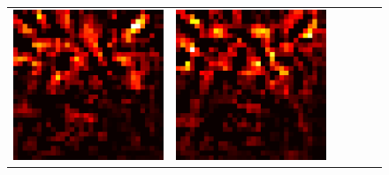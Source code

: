 \documentclass[preprint,12pt]{elsarticle}
\begin{document}
\begin{figure}[p]
\begin{tabular}{cccccc}
  \includegraphics[scale=\scale]{../visualizations/examples/cifar10/cnn/active_saliency_map/5.png} & 
  \includegraphics[scale=\scale]{../visualizations/examples/cifar10/cnn/inactive_saliency_map/5.png} \\
  

\end{tabular}
\end{figure}
\end{document}
